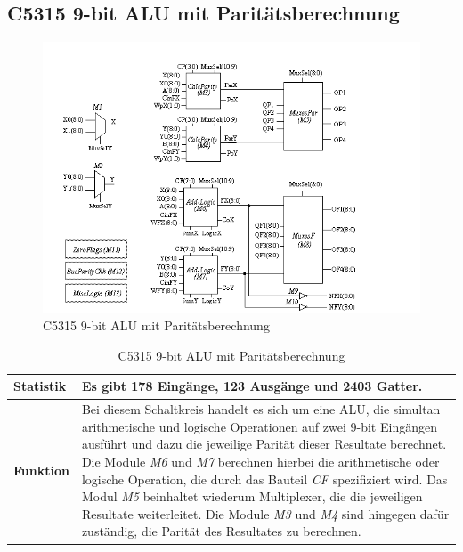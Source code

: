 \subsection*{C5315 9-bit ALU mit Paritätsberechnung}
\label{sec:c5315}
\begin{figure}[bth]
	\centering
	\includegraphics[scale=0.6]{./img/c5315}
	\caption[C5315 9-bit ALU mit Paritätsberechnung]{C5315 9-bit ALU mit Paritätsberechnung \cite{h1999}}
	\label{fig:c5315}
\end{figure}
\begin{table}[bth]
	\centering
	\caption{C5315 9-bit ALU mit Paritätsberechnung}
	\label{tab:c5315}
	\begin{tabular}{ | p{2cm} | p{12cm} |}
		\hline
		\textbf{Statistik} & Es gibt 178 Eingänge, 123 Ausgänge und 2403 Gatter. \\\hline
		\textbf{Funktion} & Bei diesem Schaltkreis handelt es sich um eine ALU, die simultan arithmetische und logische Operationen auf zwei 9-bit Eingängen ausführt und dazu die jeweilige Parität dieser Resultate berechnet. Die Module \emph{M6} und \emph{M7} berechnen hierbei die arithmetische oder logische Operation, die durch das Bauteil \emph{CF} spezifiziert wird. Das Modul \emph{M5} beinhaltet wiederum Multiplexer, die die jeweiligen Resultate weiterleitet. Die Module \emph{M3} und \emph{M4} sind hingegen dafür zuständig, die Parität des Resultates zu berechnen.\\\hline
	\end{tabular}
\end{table}
\newpage
